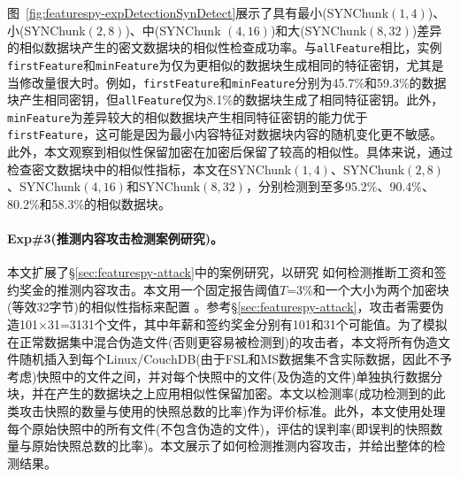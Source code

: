 图~\ref{fig:featurespy-expDetectionSynDetect}展示了具有最小(SYNChunk$(1,4)$)、小(SYNChunk$(2,8)$)、中(SYNChunk $(4,16)$)和大(SYNChunk$(8,32)$)差异的相似数据块产生的密文数据块的相似性检查成功率。与{\tt allFeature}相比，实例{\tt firstFeature}和{\tt minFeature}为仅为更相似的数据块生成相同的特征密钥，尤其是当修改量很大时。例如，{\tt firstFeature}和{\tt minFeature}分别为45.7\%和59.3\%的数据块产生相同密钥，但{\tt allFeature}仅为8.1\%的数据块生成了相同特征密钥。此外，{\tt minFeature}为差异较大的相似数据块产生相同特征密钥的能力优于{\tt firstFeature}，这可能是因为最小内容特征对数据块内容的随机变化更不敏感。此外，本文观察到相似性保留加密在加密后保留了较高的相似性。具体来说，通过检查密文数据块中的相似性指标，本文在SYNChunk$(1,4)$、SYNChunk$(2,8)$、SYNChunk$(4,16)$和SYNChunk$(8,32)$，分别检测到至多95.2\%、90.4\%、80.2\%和58.3\%的相似数据块。

\paragraph*{Exp\#3(推测内容攻击检测案例研究)。}
本文扩展了\S\ref{sec:featurespy-attack}中的案例研究，以研究 \sysnameF 如何检测推断工资和签约奖金的推测内容攻击。本文用一个固定报告阈值$T$=3\%和一个大小为两个加密块(等效32字节)的相似性指标来配置 \sysnameF。参考\S\ref{sec:featurespy-attack}，攻击者需要伪造101$\times$31=3131个文件，其中年薪和签约奖金分别有101和31个可能值。为了模拟在正常数据集中混合伪造文件(否则更容易被检测到)的攻击者，本文将所有伪造文件随机插入到每个Linux/CouchDB(由于FSL和MS数据集不含实际数据，因此不予考虑)快照中的文件之间，并对每个快照中的文件(及伪造的文件)单独执行数据分块\cite{fsl, meyer2011deduplication}，并在产生的数据块之上应用相似性保留加密。本文以检测率(\sysnameF 成功检测到的此类攻击快照的数量与使用的快照总数的比率)作为评价标准。此外，本文使用\sysnameF 处理每个原始快照中的所有文件(不包含伪造的文件)，评估\sysnameF 的误判率(即\sysnameF 误判的快照数量与原始快照总数的比率)。本文展示了\sysnameF 如何检测推测内容攻击，并给出整体的检测结果。


